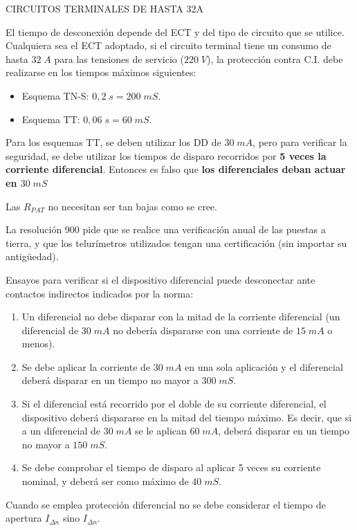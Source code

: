 CIRCUITOS TERMINALES DE HASTA 32A

El tiempo de desconexión depende del ECT y del tipo de circuito que se utilice.
Cualquiera sea el ECT adoptado, si el circuito terminal tiene un consumo de hasta $32\; A$ para las tensiones de servicio ($220\; V$), la protección contra C.I. debe realizarse en los tiempos máximos siguientes:

\begin{itemize}
	\item Esquema TN-S: $0,2\; s=200\; mS$.
	\item Esquema TT: $0,06\; s=60\; mS$.
\end{itemize} 

Para los esquemas TT, se deben utilizar los DD de $30\; mA$, pero para verificar la seguridad, se debe utilizar los tiempos de disparo recorridos por \textbf{5 veces la corriente diferencial}. Entonces es falso que \textbf{los diferenciales deban actuar en $30\; mS$}

Las $R_{PAT}$ no necesitan ser tan bajas como se cree.

La resolución 900 pide que se realice una verificación anual de las puestas a tierra, y que los telurímetros utilizados tengan una certificación (sin importar su antigüedad).

Ensayos para verificar si el dispositivo diferencial puede desconectar ante contactos indirectos indicados por la norma:
\begin{enumerate}
	\item Un diferencial no debe disparar con la mitad de la corriente diferencial (un diferencial de $30\; mA$ no debería dispararse con una corriente de $15\; mA$ o menos).
	\item Se debe aplicar la corriente de $30\; mA$ en una sola aplicación y el diferencial deberá disparar en un tiempo no mayor a $300\; mS$.
	\item Si el diferencial está recorrido por el doble de su corriente diferencial, el dispositivo deberá dispararse en la mitad del tiempo máximo. Es decir, que si a un diferencial de $30\; mA$ se le aplican $60\; mA$, deberá disparar en un tiempo no mayor a $150\; mS$.
	\item Se debe comprobar el tiempo de disparo al aplicar 5 veces su corriente nominal, y deberá ser como máximo de $40\; mS$.
\end{enumerate}

Cuando se emplea protección diferencial no se debe considerar el tiempo de apertura $I_{\Delta n}$ sino $I_{\Delta n}$.

